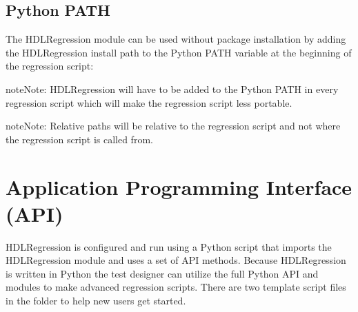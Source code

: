 \documentclass[letterpaper,10pt,english]{sphinxmanual}
\begin{document}
\section{Python PATH}
\label{\detokenize{intro:python-path}}
\sphinxAtStartPar
The HDLRegression module can be used without package installation by adding the HDLRegression install path to the
Python PATH variable at the beginning of the regression script:

\begin{sphinxVerbatim}[commandchars=\\\{\}]
 

   
\end{sphinxVerbatim}

\begin{sphinxadmonition}{note}{Note:}
\sphinxAtStartPar
HDLRegression will have to be added to the Python PATH in every regression script which will make
the regression script less portable.
\end{sphinxadmonition}

\begin{sphinxadmonition}{note}{Note:}
\sphinxAtStartPar
Relative paths will be relative to the regression script
and not where the regression script is called from.
\end{sphinxadmonition}


\chapter{Application Programming Interface (API)}
\label{\detokenize{api:application-programming-interface-api}}\label{\detokenize{api::doc}}
\sphinxAtStartPar
HDLRegression is configured and run using a Python script that imports the HDLRegression module and
uses a set of API methods. Because HDLRegression is written in Python the test designer can
utilize the full Python API and modules to make advanced regression scripts.
There are two template script files in the  folder to help new users get started.
\end{document}
